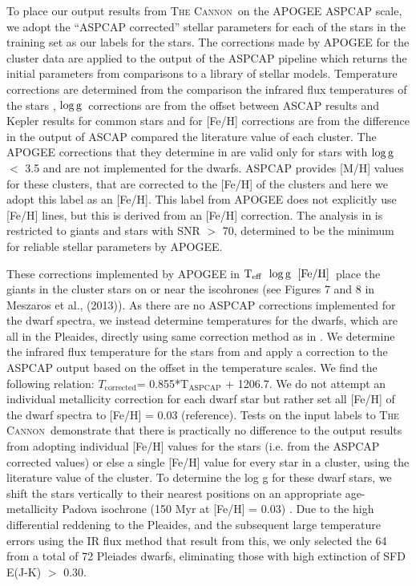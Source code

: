 \documentclass[12pt, preprint]{aastex}
\newcommand{\teff}{\mbox{$\rm T_{eff}$}}
\newcommand{\feh}{\mbox{$\rm [Fe/H]$}}
\newcommand{\logg}{\mbox{$\rm \log g$}}
\newcommand{\tc}{\textsc{The Cannon}}
\begin{document}
To place our output results from \tc\ on the APOGEE ASPCAP scale, we adopt the ``ASPCAP corrected'' stellar parameters for each of the stars in the training set as our labels for the stars. The corrections made by APOGEE for the cluster data are applied to the output of the ASPCAP pipeline which returns the initial parameters from comparisons to a library of stellar models. Temperature corrections are determined from the comparison the infrared flux temperatures of the stars \citep{Gonzalez2009}, \logg\ corrections are from the offset between ASCAP results and Kepler results for common stars and for [Fe/H] corrections are from the difference in the output of ASCAP compared the literature value of each cluster.  The APOGEE corrections that they determine in \citet{Meszaros2013} are valid only for stars with \logg\ $<$ 3.5 and are not implemented for the dwarfs. ASPCAP provides [M/H] values for these clusters, that are corrected to the [Fe/H] of the clusters and here we adopt this label as an [Fe/H]. This label from APOGEE does not explicitly use [Fe/H] lines, but this is derived from an [Fe/H] correction. The analysis in \citet{Meszaros2013} is restricted to giants and stars with SNR $>$ 70, determined to be the minimum for reliable stellar parameters by APOGEE. 

These corrections implemented by APOGEE in \teff\, \logg\, \feh\ place the giants in the cluster stars on or near the iscohrones (see Figures 7 and 8 in Meszaros et al., (2013)).  As there are no ASPCAP corrections implemented for the dwarf spectra, we instead determine temperatures for the dwarfs, which are all in the Pleaides, directly using same correction method as in \citet{Meszaros2013}. We determine the infrared flux temperature for the stars from \citep{Gonzalez2009} and apply a correction to the ASPCAP output based on the offset in the temperature scales. We find the following relation: $T_{\mbox{corrected}}$= 0.855*T$_{\mbox{ASPCAP}}$ + 1206.7. We do not attempt an individual metallicity correction for each dwarf star but rather set all [Fe/H] of the dwarf spectra to [Fe/H] = 0.03 (reference). Tests on the input labels to \tc\ demonstrate that there is practically no difference to the output results from adopting individual [Fe/H] values for the stars (i.e. from the ASPCAP corrected values) or else a single [Fe/H] value for every star in a cluster, using the literature value of the cluster. To determine the log g for these dwarf stars, we shift the stars vertically to their nearest positions on an appropriate age-metallicity Padova isochrone (150 Myr at [Fe/H] = 0.03) \citep{Girardi2010}. Due to the high differential reddening to the Pleaides, and the subsequent large temperature errors using the IR flux method that result from this, we only selected the 64 from a total of 72 Pleiades dwarfs, eliminating those with high extinction of SFD E(J-K) $>$ 0.30.
\end{document}
